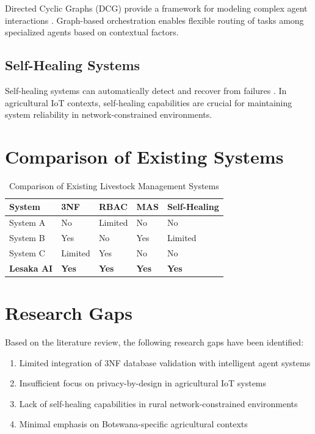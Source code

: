 Directed Cyclic Graphs (DCG) provide a framework for modeling complex agent interactions \cite{diest2010graph}. Graph-based orchestration enables flexible routing of tasks among specialized agents based on contextual factors.

\subsection{Self-Healing Systems}

Self-healing systems can automatically detect and recover from failures \cite{ghosh2007self}. In agricultural IoT contexts, self-healing capabilities are crucial for maintaining system reliability in network-constrained environments.

\section{Comparison of Existing Systems}

\begin{table}[H]
\centering
\begin{tabular}{|l|l|l|l|l|}
\hline
\textbf{System} & \textbf{3NF} & \textbf{RBAC} & \textbf{MAS} & \textbf{Self-Healing} \\
\hline
System A \cite{ref1} & No & Limited & No & No \\
System B \cite{ref2} & Yes & No & Yes & Limited \\
System C \cite{ref3} & Limited & Yes & No & No \\
\textbf{Lesaka AI} & \textbf{Yes} & \textbf{Yes} & \textbf{Yes} & \textbf{Yes} \\
\hline
\end{tabular}
\caption{Comparison of Existing Livestock Management Systems}
\end{table}

\section{Research Gaps}

Based on the literature review, the following research gaps have been identified:

\begin{enumerate}
    \item Limited integration of 3NF database validation with intelligent agent systems
    \item Insufficient focus on privacy-by-design in agricultural IoT systems
    \item Lack of self-healing capabilities in rural network-constrained environments
    \item Minimal emphasis on Botswana-specific agricultural contexts
\end{enumerate}

